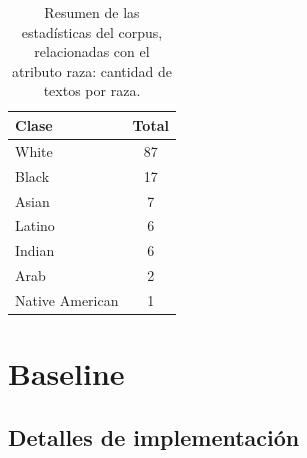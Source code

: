 \begin{table}[htpb]
    \centering
        \begin{tabular}{lc}
        \toprule
            \textbf{Clase} & \textbf{Total} \\
        \midrule
                     White & 87 \\
                     Black & 17 \\
                     Asian & 7 \\
                    Latino & 6 \\
                    Indian & 6 \\
                      Arab & 2 \\
           Native American & 1 \\

        \bottomrule
        \end{tabular}
    \caption{Resumen de las estad\'isticas del corpus, relacionadas con el atributo raza: cantidad de textos por raza.}
    \label{table:stats_race}
\end{table}

\section{Baseline}

\subsection{Detalles de implementaci\'on}

